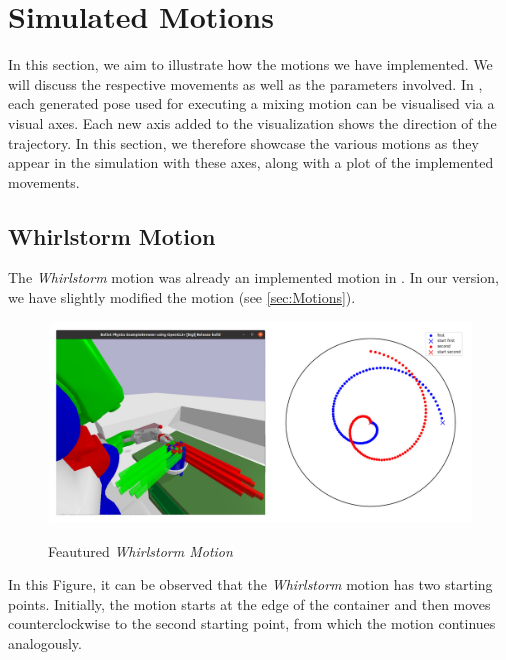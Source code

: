 \section{Simulated Motions}
\label{sec:simulated motions}
In this section, we aim to illustrate how the motions we have implemented.
We will discuss the respective movements as well as the parameters involved. In  \cite{pycram}, each generated pose used for executing 
a mixing motion can be visualised via a visual axes. Each new axis added to the visualization shows the direction of the trajectory. 
In this section, we therefore showcase the various motions as they appear in the simulation with these axes, along with a plot of the implemented movements.



\subsection{Whirlstorm Motion}
The \textit{Whirlstorm} motion was already an implemented motion in  \cite{pycram}. In our version, we have slightly modified the motion (see \ref{sec:Motions}).

\begin{figure}[H]
    \includegraphics[scale=0.3]{Graphics/whirlstorm_showcase.jpg}
    \label{fig:whirlstormshowcase}
    \caption{Feautured \textit{Whirlstorm Motion}}
\end{figure}

In this Figure, it can be observed that the \textit{Whirlstorm} motion has two starting points. Initially, the motion starts at the edge of the container and then moves counterclockwise to the second starting point, from which the motion continues analogously.


